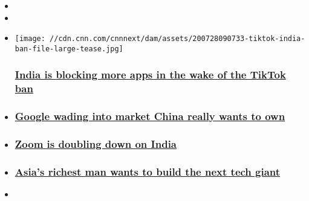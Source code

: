 \begin{itemize}
\item
\item
\end{itemize}

\begin{itemize}
\item
  \href{/2020/07/28/tech/india-china-apps-ban-hnk-intl/index.html}{}

  \texttt{[image: //cdn.cnn.com/cnnnext/dam/assets/200728090733-tiktok-india-ban-file-large-tease.jpg]}

  \hypertarget{india-is-blocking-more-apps-in-the-wake-of-the-tiktok-ban}{%
  \subsubsection{\texorpdfstring{\href{/2020/07/28/tech/india-china-apps-ban-hnk-intl/index.html}{India
  is blocking more apps in the wake of the TikTok
  ban}}{India is blocking more apps in the wake of the TikTok ban}}\label{india-is-blocking-more-apps-in-the-wake-of-the-tiktok-ban}}
\item
  \hypertarget{google-wading-into-market-china-really-wants-to-own}{%
  \subsubsection{\texorpdfstring{\href{/2020/07/24/tech/jio-google-india-china-hnk-intl/index.html}{Google
  wading into market China really wants to
  own}}{Google wading into market China really wants to own}}\label{google-wading-into-market-china-really-wants-to-own}}
\item
  \hypertarget{zoom-is-doubling-down-on-india}{%
  \subsubsection{\texorpdfstring{\href{/2020/07/24/tech/zoom-india-hiring-china/index.html}{Zoom
  is doubling down on
  India}}{Zoom is doubling down on India}}\label{zoom-is-doubling-down-on-india}}
\item
  \hypertarget{asias-richest-man-wants-to-build-the-next-tech-giant}{%
  \subsubsection{\texorpdfstring{\href{/videos/business/2020/05/29/mukesh-ambani-jio-platforms-orig.cnn-business}{Asia's
  richest man wants to build the next tech
  giant}}{Asia's richest man wants to build the next tech giant}}\label{asias-richest-man-wants-to-build-the-next-tech-giant}}
\item
  \hypertarget{many-indian-citizens-believe-their-government-is-trying-to-steal-and-sell-their-data-heres-why}{%
}
\end{itemize}
